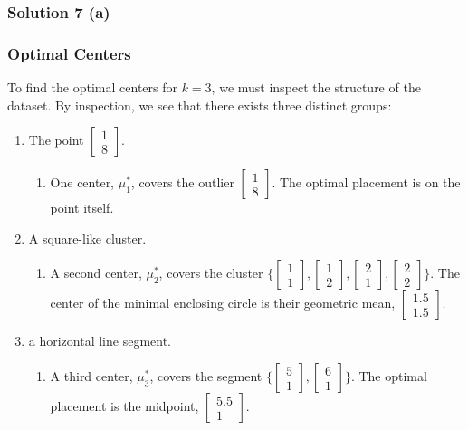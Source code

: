 \documentclass{article}
\begin{document}
\subsubsection*{Solution 7 (a)}
\subsubsection*{Optimal Centers}
\begin{flushleft}
To find the optimal centers for $k=3$, we must inspect the structure of the dataset. By inspection, we see that there exists three distinct groups:
\begin{enumerate}
  \item The point $\begin{bmatrix}1 \\ 8\end{bmatrix}$.
  \begin{enumerate}
    \item One center, $\mu_1^*$, covers the outlier $\begin{bmatrix}1 \\ 8\end{bmatrix}$. The optimal placement is on the point itself.
  \end{enumerate}
  \item A square-like cluster.
  \begin{enumerate}
    \item A second center, $\mu_2^*$, covers the cluster $\{\begin{bmatrix}1 \\ 1\end{bmatrix}, \begin{bmatrix}1 \\ 2\end{bmatrix}, \begin{bmatrix}2 \\ 1\end{bmatrix}, \begin{bmatrix}2 \\ 2\end{bmatrix}\}$. The center of the minimal enclosing circle is their geometric mean, $\begin{bmatrix}1.5 \\ 1.5\end{bmatrix}$.
  \end{enumerate}
  \item a horizontal line segment.
  \begin{enumerate}
    \item A third center, $\mu_3^*$, covers the segment $\{\begin{bmatrix}5 \\ 1\end{bmatrix}, \begin{bmatrix}6 \\ 1\end{bmatrix}\}$. The optimal placement is the midpoint, $\begin{bmatrix}5.5 \\ 1\end{bmatrix}$.

\end{enumerate}
\end{enumerate}
\end{flushleft}
\end{document}
